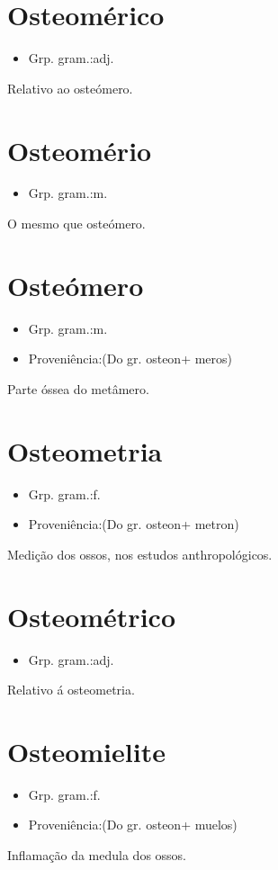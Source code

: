 \section{Osteomérico}
\begin{itemize}
\item {Grp. gram.:adj.}
\end{itemize}
Relativo ao osteómero.
\section{Osteomério}
\begin{itemize}
\item {Grp. gram.:m.}
\end{itemize}
O mesmo que \textunderscore osteómero\textunderscore .
\section{Osteómero}
\begin{itemize}
\item {Grp. gram.:m.}
\end{itemize}
\begin{itemize}
\item {Proveniência:(Do gr. \textunderscore osteon\textunderscore  + \textunderscore meros\textunderscore )}
\end{itemize}
Parte óssea do metâmero.
\section{Osteometria}
\begin{itemize}
\item {Grp. gram.:f.}
\end{itemize}
\begin{itemize}
\item {Proveniência:(Do gr. \textunderscore osteon\textunderscore  + \textunderscore metron\textunderscore )}
\end{itemize}
Medição dos ossos, nos estudos anthropológicos.
\section{Osteométrico}
\begin{itemize}
\item {Grp. gram.:adj.}
\end{itemize}
Relativo á osteometria.
\section{Osteomielite}
\begin{itemize}
\item {Grp. gram.:f.}
\end{itemize}
\begin{itemize}
\item {Proveniência:(Do gr. \textunderscore osteon\textunderscore  + \textunderscore muelos\textunderscore )}
\end{itemize}
Inflamação da medula dos ossos.
